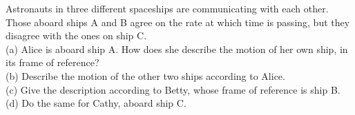 Astronauts in three different spaceships are communicating with each other.
Those aboard ships A and B agree on the rate at which time is passing, but
they disagree with the ones on ship C. \\
(a) Alice is aboard ship A. How does she describe the motion of her own ship, in its frame of reference?\\
(b) Describe the motion of the other two ships according to Alice.\\
(c) Give the description according to Betty, whose frame of reference is ship B.\\
(d) Do the same for Cathy, aboard ship C.
